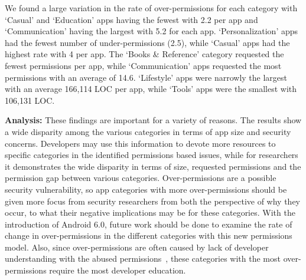 \documentclass{llncs}
\begin{document}
\begin{table}[]
\begin{center}
\begin{tabular}{ | l | c | c | c | c | c |  c |}
	
	
  \end{tabular}
  \end{center}
\end{table}




We found a large variation in the rate of over-permissions for each category with `Casual' and `Education' apps having the fewest with 2.2 per app and `Communication' having the largest with 5.2 for each app. `Personalization' apps had the fewest number of under-permissions (2.5), while `Casual' apps had the highest rate with 4 per app. The `Books \& Reference' category requested the fewest permissions per app, while `Communication' apps requested the most permissions with an average of 14.6. `Lifestyle' apps were narrowly the largest with an average 166,114 LOC per app, while `Tools' apps were the smallest with 106,131 LOC.

\noindent
\textbf{Analysis:} These findings are important for a variety of reasons. The results show a wide disparity among the various categories in terms of app size and security concerns. Developers may use this information to devote more resources to specific categories in the identified permissions based issues, while for researchers it demonstrates the wide disparity in terms of size, requested permissions and the permission gap between various categories. Over-permissions are a possible security vulnerability, so app categories with more over-permissions should be given more focus from security researchers from both the perspective of why they occur, to what their negative implications may be for these categories. With the introduction of Android 6.0, future work should be done to examine the rate of change in over-permissions in the different categories with this new permissions model. Also, since over-permissions are often caused by lack of developer understanding with the abused permissions~\cite{6624000}, these categories with the most over-permissions require the most developer education.
\end{document}
